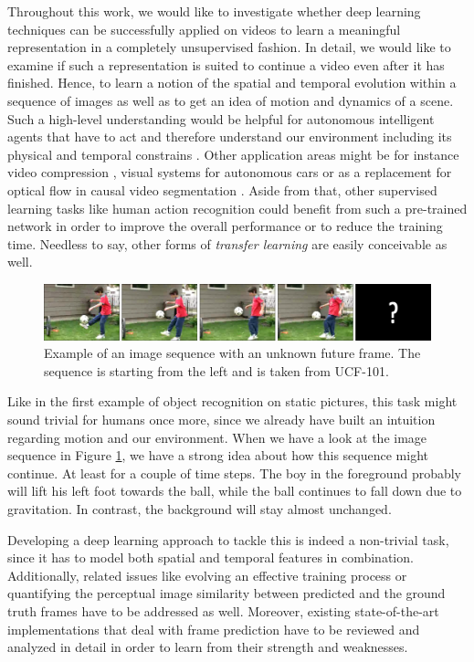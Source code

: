 Throughout this work, we would like to investigate whether deep learning techniques can be successfully applied on videos to learn a meaningful representation in a completely unsupervised fashion. In detail, we would like to examine if such a representation is suited to continue a video even after it has finished. Hence, to learn a notion of the spatial and temporal evolution within a sequence of images as well as to get an idea of motion and dynamics of a scene. Such a high-level understanding would be helpful for autonomous intelligent agents that have to act and therefore understand our environment including its physical and temporal constrains \parencite{unsup_learn_lstm}. Other application areas might be for instance video compression \parencite{frame_interpol}, visual systems for autonomous cars or as a replacement for optical flow in causal video segmentation \parencite{causal_video_seg}. Aside from that, other supervised learning tasks like human action recognition could benefit from such a pre-trained network in order to improve the overall performance or to reduce the training time. Needless to say, other forms of \textit{transfer learning} are easily conceivable as well.

\begin{figure}[htpb]
	\centering
	\includegraphics[width=1.0\linewidth]{figures/ucf-intro/serie1.png} 
	\caption[Example Image Sequence]{Example of an image sequence with an unknown future frame. The sequence is starting from the left and is taken from UCF-101.} \label{fig:intro-seq}
\end{figure}

Like in the first example of object recognition on static pictures, this task might sound trivial for humans once more, since we already have built an intuition regarding motion and our environment. When we have a look at the image sequence in Figure \ref{fig:intro-seq}, we have a strong idea about how this sequence might continue. At least for a couple of time steps. The boy in the foreground probably will lift his left foot towards the ball, while the ball continues to fall down due to gravitation. In contrast, the background will stay almost unchanged.

Developing a deep learning approach to tackle this is indeed a non-trivial task, since it has to model both spatial and temporal features in combination. Additionally, related issues like evolving an effective training process or quantifying the perceptual image similarity between predicted and the ground truth frames have to be addressed as well. Moreover, existing state-of-the-art implementations that deal with frame prediction have to be reviewed and analyzed in detail in order to learn from their strength and weaknesses.


